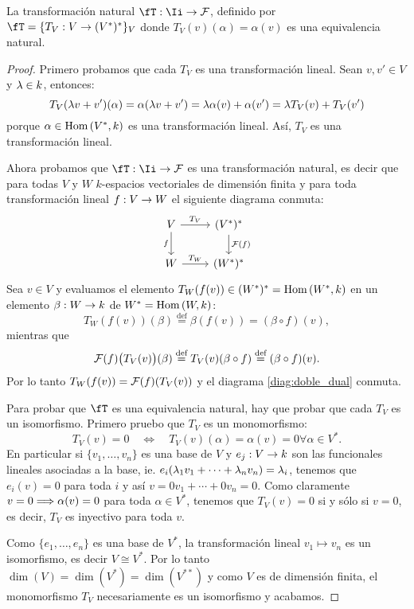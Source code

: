 \begin{ejercicio}\label{ej:70}
  La transformaci\'on natural $\fT:\Ii\ra\Ff$, definido por $\fT=\{T_V:V\ra(V^*)^*\}_{V}$
  donde $T_V(v)(\alpha)=\alpha(v)$ es una equivalencia natural.
\end{ejercicio}
\begin{proof}%
  Primero probamos que cada $T_V$ es una transformaci\'on lineal. Sean $v,v'\in V$ y $\lambda\in k$,
  entonces:
  \[
    T_V(\lambda v+v')(\alpha)=\alpha(\lambda v+v')=\lambda\alpha(v)+\alpha(v')=\lambda T_V(v)+T_V(v')
  \]
  porque $\alpha\in\text{Hom}\left( V^*,k \right)$ es una transformaci\'on lineal. As\'i, $T_V$ es una
  transformaci\'on lineal.

  Ahora probamos que $\fT:\Ii\ra\Ff$ es una transformaci\'on natural, es decir que para todas
  $V$ y $W$ $k$-espacios vectoriales de dimensi\'on finita y para toda transformaci\'on
  lineal $f:V\rightarrow W$ el siguiente diagrama conmuta:
  \begin{equation}\label{diag:doble_dual}
    \begin{tikzcd}
      V \arrow[r,"T_V"] \arrow[d,"f"'] & (V^*)^* \arrow[d,"\Ff(f)"] \\
      W \arrow[r,"T_W"] & (W^*)^*
    \end{tikzcd}
  \end{equation}
  Sea $v\in V$ y evaluamos el elemento $T_W(f(v))\in(W^*)^*=\text{Hom}\left( W^*,k \right)$ en un
  elemento $\beta:W\rightarrow k$ de $W^*=\text{Hom}\left( W,k \right)$:
  \[
    T_W(f(v))(\beta)  \stackrel{\text{def}}{=}  \beta(f(v)) = (\beta\circ f)(v),
  \]
  mientras que
  \[
    \mathcal{F}(f)\big( T_V(v) \big)(\beta) \stackrel{\text{def}}{=} T_V(v)(\beta\circ f)
    \stackrel{\text{def}}{=} (\beta\circ f)(v).
  \]
  Por lo tanto $T_W(f(v))=\mathcal{F}(f)(T_V(v))$ y el diagrama \ref{diag:doble_dual} conmuta.

  Para probar que $\fT$ es una equivalencia natural, hay que probar que cada
  $T_V$ es un isomorfismo. Primero pruebo que $T_V$ es un monomorfismo:
  \[
    T_V(v)=0 \quad\iff\quad T_V(v)(\alpha)=\alpha(v)=0 \forall \alpha\in V^*.
  \]
  En particular si $\{v_1,\ldots,v_n\}$ es una base de $V$ y $e_j:V\rightarrow k$ son
  las funcionales lineales asociadas a la base, ie. $e_i(\lambda_1v_1+\cdots+\lambda_nv_n)=\lambda_i$,
  tenemos que $e_i(v)=0$ para toda $i$ y as\'i $v=0v_1+\cdots+0v_n=0$.
  Como claramente $v=0\Longrightarrow\alpha(v)=0$ para toda $\alpha\in V^*$, tenemos que
  $T_V(v)=0$ si y s\'olo si $v=0$, es decir, $T_V$ es inyectivo para toda $v$.

  Como $\{e_1,\ldots,e_n\}$ es una base de $V^*$, la transformaci\'on lineal
  $v_1\mapsto v_n$ es un isomorfismo, es decir $V\cong V^*$. Por lo tanto
  $\dim(V)=\dim(V^*)=\dim(V^{**})$ y como $V$ es de dimensi\'on finita, el
  monomorfismo $T_V$ necesariamente es un isomorfismo y acabamos.  
\end{proof}%

